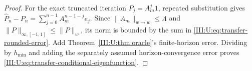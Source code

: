 \begin{proof}
For the exact truncated iteration $P_j=A_m^j1$, repeated substitution
gives $\widehat P_n-P_n=\sum_{j=0}^{n-1}A_m^{n-1-j}e_j$.
Since $\|A_m\|_{w\to w}\le\Lambda$ and
$\|P\|_{\infty,[-1,1]}\le\|P\|_w$, its norm is bounded by the
sum in \eqref{III:U:eq:transfer-rounded-error}. Add
Theorem~\ref{III:U:thm:oracle}'s finite-horizon error. Dividing by
$h_{\min}$ and adding the separately assumed horizon-convergence error
proves \eqref{III:U:eq:transfer-conditional-eigenfunction}.
\end{proof}
